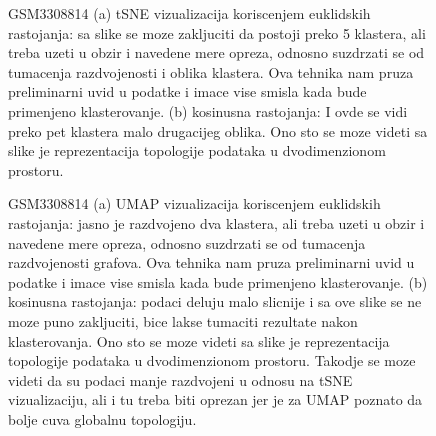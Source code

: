 \documentclass{article}
\begin{document}
\begin{figure}[H]
    \centering
    \caption{ GSM3308814 (a) tSNE vizualizacija koriscenjem euklidskih rastojanja: sa slike se moze zakljuciti da postoji preko 5 klastera, ali treba uzeti u obzir i navedene mere opreza, odnosno suzdrzati se od tumacenja razdvojenosti i oblika klastera. Ova tehnika nam pruza preliminarni uvid u podatke i imace vise smisla kada bude primenjeno klasterovanje.  (b) kosinusna rastojanja: I ovde se vidi preko pet klastera malo drugacijeg oblika. Ono sto se moze videti sa slike je reprezentacija topologije podataka u dvodimenzionom prostoru. }
    \label{fig:visualize_14_tsne}
\end{figure}

\begin{figure}[H]
    \centering
    \caption{ GSM3308814 (a) UMAP vizualizacija koriscenjem euklidskih rastojanja: jasno je razdvojeno dva klastera, ali treba uzeti u obzir i navedene mere opreza, odnosno suzdrzati se od tumacenja razdvojenosti grafova. Ova tehnika nam pruza preliminarni uvid u podatke i imace vise smisla kada bude primenjeno klasterovanje.  (b) kosinusna rastojanja: podaci deluju malo slicnije i sa ove slike se ne moze puno zakljuciti, bice lakse tumaciti rezultate nakon klasterovanja. Ono sto se moze videti sa slike je reprezentacija topologije podataka u dvodimenzionom prostoru. Takodje se moze videti da su podaci manje razdvojeni u odnosu na tSNE vizualizaciju, ali i tu treba biti oprezan jer je za UMAP poznato da bolje cuva globalnu topologiju. }
    \label{fig:visualize_14_umap}
\end{figure}
\end{document}
